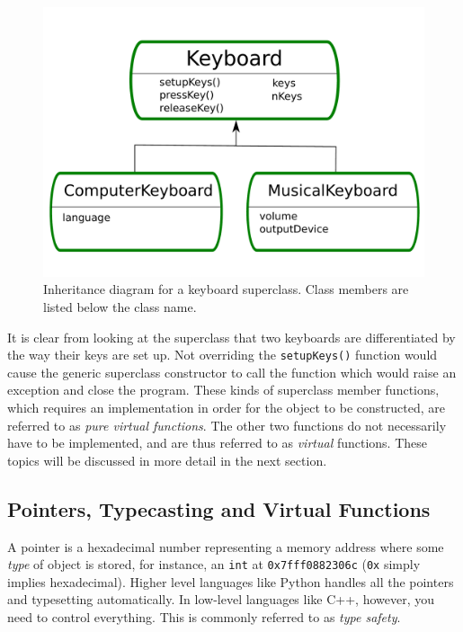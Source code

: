 \begin{figure}[h]
 \begin{center}
  \includegraphics[scale=0.35]{../Graphics/UMLkeyboard.pdf}
  \caption{Inheritance diagram for a keyboard superclass. Class members are listed below the class name.}
  \label{fig:UMLkeyboard}
 \end{center}
\end{figure}

\clearpage


It is clear from looking at the superclass that two keyboards are differentiated by the way their keys are set up. Not overriding the \verb+setupKeys()+ function would cause the generic superclass constructor to call the function which would raise an exception and close the program. These kinds of superclass member functions, which requires an implementation in order for the object to be constructed, are referred to as \textit{pure virtual functions}. The other two functions do not necessarily have to be implemented, and are thus referred to as \textit{virtual} functions. These topics will be discussed in more detail in the next section.

\subsection{Pointers, Typecasting and Virtual Functions}

A pointer is a hexadecimal number representing a memory address where some \textit{type} of object is stored, for instance, an \verb+int+ at \verb+0x7fff0882306c+ (\verb+0x+ simply implies hexadecimal). Higher level languages like Python handles all the pointers and typesetting automatically. In low-level languages like C++, however, you need to control everything. This is commonly referred to as \textit{type safety}. 

